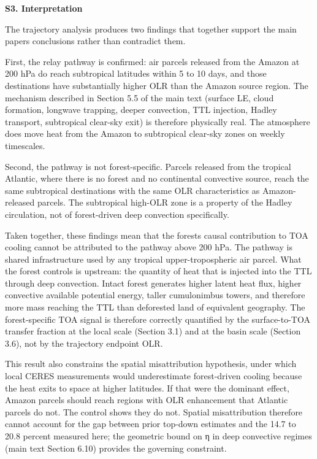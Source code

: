 \textbf{S3. Interpretation}

The trajectory analysis produces two findings that together support the
main paper\textquotesingle s conclusions rather than contradict them.

First, the relay pathway is confirmed: air parcels released from the
Amazon at 200 hPa do reach subtropical latitudes within 5 to 10 days,
and those destinations have substantially higher OLR than the Amazon
source region. The mechanism described in Section 5.5 of the main text
(surface LE, cloud formation, longwave trapping, deeper convection, TTL
injection, Hadley transport, subtropical clear-sky exit) is therefore
physically real. The atmosphere does move heat from the Amazon to
subtropical clear-sky zones on weekly timescales.

Second, the pathway is not forest-specific. Parcels released from the
tropical Atlantic, where there is no forest and no continental
convective source, reach the same subtropical destinations with the same
OLR characteristics as Amazon-released parcels. The subtropical high-OLR
zone is a property of the Hadley circulation, not of forest-driven deep
convection specifically.

Taken together, these findings mean that the forest\textquotesingle s
causal contribution to TOA cooling cannot be attributed to the pathway
above 200 hPa. The pathway is shared infrastructure used by any tropical
upper-tropospheric air parcel. What the forest controls is upstream: the
quantity of heat that is injected into the TTL through deep convection.
Intact forest generates higher latent heat flux, higher convective
available potential energy, taller cumulonimbus towers, and therefore
more mass reaching the TTL than deforested land of equivalent geography.
The forest-specific TOA signal is therefore correctly quantified by the
surface-to-TOA transfer fraction at the local scale (Section 3.1) and at
the basin scale (Section 3.6), not by the trajectory endpoint OLR.

This result also constrains the spatial misattribution hypothesis,
under which local CERES measurements would underestimate forest-driven
cooling because the heat exits to space at higher latitudes. If that
were the dominant effect, Amazon parcels should reach regions with OLR
enhancement that Atlantic parcels do not. The control shows they do
not. Spatial misattribution therefore cannot account for the gap
between prior top-down estimates and the 14.7 to 20.8 percent measured
here; the geometric bound on η in deep convective regimes (main text
Section 6.10) provides the governing constraint.

